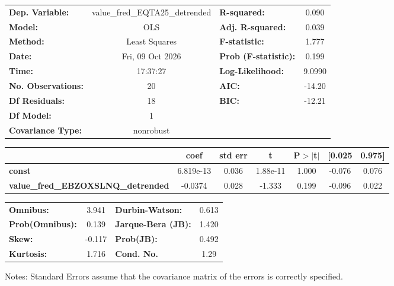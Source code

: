 \begin{center}
\begin{tabular}{lclc}
\toprule
\textbf{Dep. Variable:}                    & value\_fred\_EQTA25\_detrended & \textbf{  R-squared:         } &     0.090   \\
\textbf{Model:}                            &              OLS               & \textbf{  Adj. R-squared:    } &     0.039   \\
\textbf{Method:}                           &         Least Squares          & \textbf{  F-statistic:       } &     1.777   \\
\textbf{Date:}                             &        Fri, 09 Oct 2026        & \textbf{  Prob (F-statistic):} &    0.199    \\
\textbf{Time:}                             &            17:37:27            & \textbf{  Log-Likelihood:    } &    9.0990   \\
\textbf{No. Observations:}                 &                 20             & \textbf{  AIC:               } &    -14.20   \\
\textbf{Df Residuals:}                     &                 18             & \textbf{  BIC:               } &    -12.21   \\
\textbf{Df Model:}                         &                  1             & \textbf{                     } &             \\
\textbf{Covariance Type:}                  &           nonrobust            & \textbf{                     } &             \\
\bottomrule
\end{tabular}
\begin{tabular}{lcccccc}
                                           & \textbf{coef} & \textbf{std err} & \textbf{t} & \textbf{P$> |$t$|$} & \textbf{[0.025} & \textbf{0.975]}  \\
\midrule
\textbf{const}                             &    6.819e-13  &        0.036     &  1.88e-11  &         1.000        &       -0.076    &        0.076     \\
\textbf{value\_fred\_EBZOXSLNQ\_detrended} &      -0.0374  &        0.028     &    -1.333  &         0.199        &       -0.096    &        0.022     \\
\bottomrule
\end{tabular}
\begin{tabular}{lclc}
\textbf{Omnibus:}       &  3.941 & \textbf{  Durbin-Watson:     } &    0.613  \\
\textbf{Prob(Omnibus):} &  0.139 & \textbf{  Jarque-Bera (JB):  } &    1.420  \\
\textbf{Skew:}          & -0.117 & \textbf{  Prob(JB):          } &    0.492  \\
\textbf{Kurtosis:}      &  1.716 & \textbf{  Cond. No.          } &     1.29  \\
\bottomrule
\end{tabular}
\end{center}

Notes: \newline
 [1] Standard Errors assume that the covariance matrix of the errors is correctly specified.